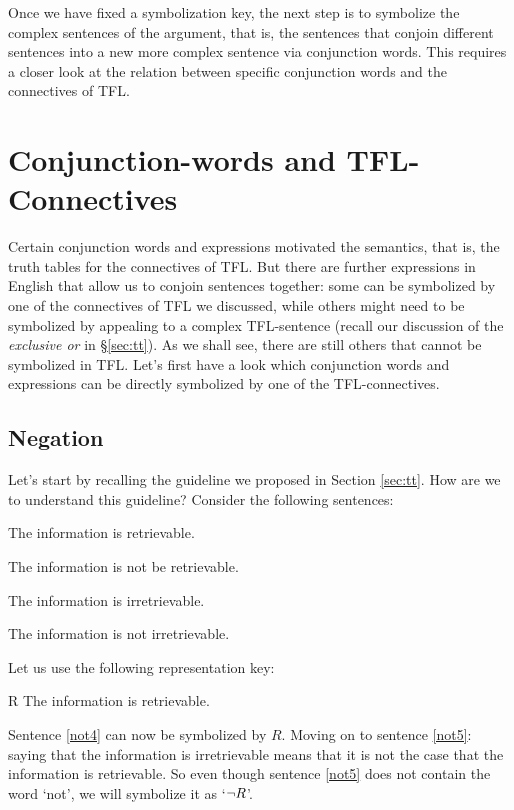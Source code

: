 Once we have fixed a symbolization key, the next step is to symbolize the complex sentences of the argument, that is, the sentences that conjoin different sentences into a new more complex sentence via conjunction words. This requires a closer look at the relation between specific conjunction words and the connectives of TFL.

\section{Conjunction-words and TFL-Connectives}\label{sec:symbcon}
Certain conjunction words and expressions motivated the semantics, that is, the truth tables for the connectives of TFL. But there are further expressions in English that allow us to conjoin sentences together: some can be symbolized by one of the connectives of TFL we discussed, while others might need to be symbolized by appealing to a complex TFL-sentence (recall our discussion of the \emph{exclusive or} in \S\ref{sec:tt}). As we shall see, there are still others that cannot be symbolized in TFL. Let's first have a look which conjunction words and expressions can be directly symbolized by one of the TFL-connectives.

\subsection{Negation}
Let's start by recalling the guideline we proposed in Section \ref{sec:tt}.
How are we to understand this guideline? Consider the following sentences:
 \begin{earg}
		\item[\ex{not4}] The information is retrievable.
		\item[\ex{not4b}] The information is not be retrievable.
		\item[\ex{not5}] The information is irretrievable.
		\item[\ex{not5b}] The information is not irretrievable.
	\end{earg}
Let us use the following representation key:
	\begin{ekey}
		\item[R] The information is retrievable.
	\end{ekey}
Sentence \ref{not4} can now be symbolized by $R$. Moving on to sentence \ref{not5}: saying that the information is irretrievable means that it is not the case that the information is retrievable. So even though sentence \ref{not5} does not contain the word `not', we will symbolize it as `$\neg R$'.

